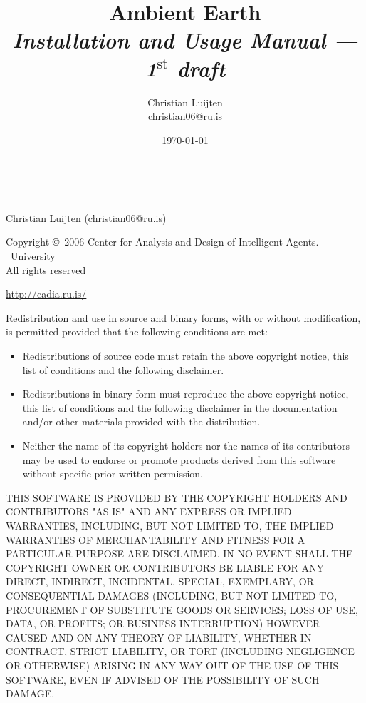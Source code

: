 \documentclass[english,a4paper,twoside]{scrreprt}
\title{Ambient Earth\\
       {\Large \emph{Installation and Usage Manual --- 1$^{\text{st}}$ draft\/}}}
\author{Christian Luijten\\\url{christian06@ru.is}}
\date{\today}
\begin{document}

\maketitle

\mbox{} \\
\vfill

\begin{adjustwidth}{4em}{4em}
{\scriptsize
  Christian Luijten (\url{christian06@ru.is})

  Copyright \copyright\ 2006 Center for Analysis and Design of Intelligent
  Agents. \\
  \Rvk\ University \\
  All rights reserved

  \url{http://cadia.ru.is/}

  Redistribution and use in source and binary forms, with or without
  modification, is permitted provided that the following conditions are met:

  \begin{itemize}
    \item Redistributions of source code must retain the above copyright
      notice, this list of conditions and the following disclaimer.

    \item Redistributions in binary form must reproduce the above copyright
      notice, this list of conditions and the following disclaimer in the
      documentation and/or other materials provided with the distribution.

    \item Neither the name of its copyright holders nor the names of its
      contributors may be used to endorse or promote products derived from this
      software without specific prior written permission.

  \end{itemize}

  THIS SOFTWARE IS PROVIDED BY THE COPYRIGHT HOLDERS AND CONTRIBUTORS "AS IS"
  AND ANY EXPRESS OR IMPLIED WARRANTIES, INCLUDING, BUT NOT LIMITED TO, THE
  IMPLIED WARRANTIES OF MERCHANTABILITY AND FITNESS FOR A PARTICULAR PURPOSE
  ARE DISCLAIMED. IN NO EVENT SHALL THE COPYRIGHT OWNER OR CONTRIBUTORS BE
  LIABLE FOR ANY DIRECT, INDIRECT, INCIDENTAL, SPECIAL, EXEMPLARY, OR
  CONSEQUENTIAL DAMAGES (INCLUDING, BUT NOT LIMITED TO, PROCUREMENT OF
  SUBSTITUTE GOODS OR SERVICES; LOSS OF USE, DATA, OR PROFITS; OR BUSINESS
  INTERRUPTION) HOWEVER CAUSED AND ON ANY THEORY OF LIABILITY, WHETHER IN
  CONTRACT, STRICT LIABILITY, OR TORT (INCLUDING NEGLIGENCE OR OTHERWISE)
  ARISING IN ANY WAY OUT OF THE USE OF THIS SOFTWARE, EVEN IF ADVISED OF THE
  POSSIBILITY OF SUCH DAMAGE.
}
\end{adjustwidth}

\tableofcontents








\end{document}
